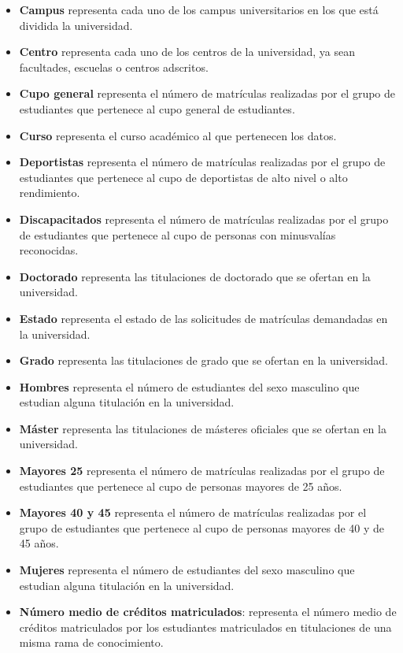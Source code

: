 \begin{itemize}
	\item \textbf{Campus} representa cada uno de los campus universitarios en los que está dividida la universidad.
	\item \textbf{Centro} representa cada uno de los centros de la universidad, ya sean facultades, escuelas o centros adscritos.
	\item \textbf{Cupo general} representa el número de matrículas realizadas por el grupo de estudiantes que pertenece al cupo general de estudiantes.
	\item \textbf{Curso} representa el curso académico al que pertenecen los datos.
	\item \textbf{Deportistas} representa el número de matrículas realizadas por el grupo de estudiantes que pertenece al cupo de deportistas de alto nivel o alto rendimiento.
	\item \textbf{Discapacitados} representa el número de matrículas realizadas por el grupo de estudiantes que pertenece al cupo de personas con minusvalías reconocidas.
	\item \textbf{Doctorado} representa las titulaciones de doctorado que se ofertan en la universidad.
	\item \textbf{Estado} representa el estado de las solicitudes de matrículas demandadas en la universidad.
	\item \textbf{Grado} representa las titulaciones de grado que se ofertan en la universidad.
	\item \textbf{Hombres} representa el número de estudiantes del sexo masculino que estudian alguna titulación en la universidad.
	\item \textbf{Máster} representa las titulaciones de másteres oficiales que se ofertan en la universidad.
	\item \textbf{Mayores 25} representa el número de matrículas realizadas por el grupo de estudiantes que pertenece al cupo de personas mayores de 25 años.
	\item \textbf{Mayores 40 y 45 } representa el número de matrículas realizadas por el grupo de estudiantes que pertenece al cupo de personas mayores de 40 y de 45 años.
	\item \textbf{Mujeres} representa el número de estudiantes del sexo masculino que estudian alguna titulación en la universidad.
	\item \textbf{Número medio de créditos matriculados}: representa el número medio de créditos matriculados por los estudiantes matriculados en titulaciones de una misma rama de conocimiento.

\end{itemize}
